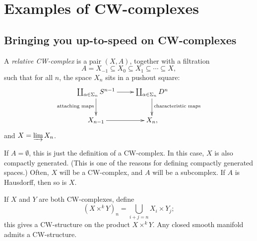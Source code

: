 \section{Examples of CW-complexes}
\subsection{Bringing you up-to-speed on CW-complexes}
\begin{definition}
    A \emph{relative CW-complex} is a pair $(X,A)$, together with a filtration
    $$A=X_{-1}\subseteq X_0\subseteq X_1\subseteq\cdots\subseteq X,$$
    such that for all $n$, the space $X_n$ sits in a pushout square:
    $$
    \xymatrix{
	\coprod_{\alpha\in \Sigma_n}S^{n-1}\ar[r]\ar[d]_{\text{attaching maps}} & \coprod_{\alpha\in \Sigma_n}D^n\ar[d]^{\text{characteristic maps}}\\
	X_{n-1}\ar[r] & X_n,
    }
    $$
    and $X=\varinjlim X_n$.
\end{definition}
If $A=\emptyset$, this is just the definition of a CW-complex.
In this case, $X$ is also compactly generated.
(This is one of the reasons for defining compactly generated spaces.)
Often, $X$ will be a CW-complex, and $A$ will be a subcomplex.
If $A$ is Hausdorff, then so is $X$.

If $X$ and $Y$ are both CW-complexes, define
$$(X\times^k Y)_n = \bigcup_{i+j = n}X_i\times Y_j;$$
this gives a CW-structure on the product $X\times^k Y$.
Any closed smooth manifold admits a CW-structure. 

